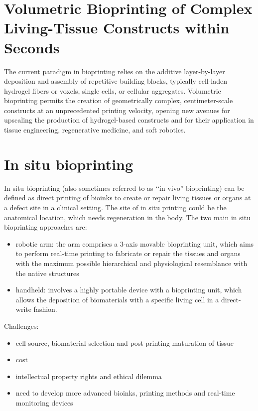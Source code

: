 \section{Volumetric Bioprinting of Complex Living-Tissue Constructs within Seconds}
The current paradigm in bioprinting relies on the additive layer-by-layer deposition and assembly of repetitive building blocks, typically cell-laden hydrogel fibers or voxels, single cells, or cellular aggregates.  Volumetric bioprinting permits the creation of geometrically complex, centimeter-scale constructs at an unprecedented printing velocity, opening new avenues for upscaling the  production of hydrogel-based constructs and for their application in tissue engineering, regenerative medicine, and soft robotics.

\section{In situ bioprinting}
In situ bioprinting (also sometimes referred to as ‘‘in vivo” bioprinting) can be defined as direct printing of bioinks to create or repair living tissues or organs at a defect site in a clinical setting. The site of in situ printing could be the anatomical location, which needs regeneration in the body.
The two main in situ bioprinting approaches are:
\begin{itemize}
\item robotic arm: the arm comprises a 3-axis movable bioprinting unit, which aims to perform real-time printing to fabricate or repair the tissues and organs with the maximum possible hierarchical and physiological resemblance with the native structures
\item handheld: involves a highly portable device with a bioprinting unit, which allows the deposition of biomaterials with a specific living cell in a direct-write fashion.
\end{itemize}

Challenges:
\begin{itemize}
\item cell source, biomaterial selection and post-printing maturation of tissue
\item cost
\item intellectual property rights and ethical dilemma
\item need to develop more advanced bioinks, printing methods and real-time monitoring devices
\end{itemize}


